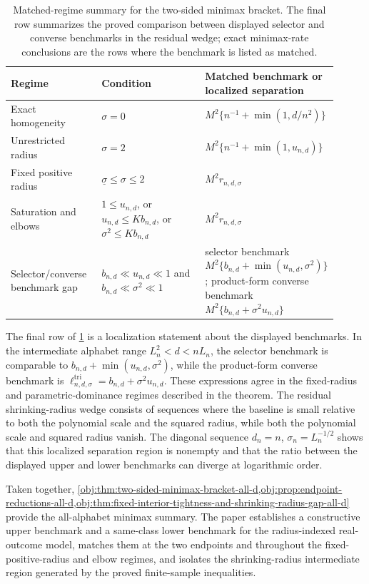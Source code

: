 \begin{table}[t]
\centering
\begin{tabular}{p{0.28\linewidth}p{0.33\linewidth}p{0.30\linewidth}}
\hline
Regime & Condition & Matched benchmark or localized separation \\
\hline
Exact homogeneity & \(\sigma=0\) & \(M^2\{n^{-1}+\min(1,d/n^2)\}\) \\
Unrestricted radius & \(\sigma=2\) & \(M^2\{n^{-1}+\min(1,u_{n,d})\}\) \\
Fixed positive radius & \(\underline\sigma\le\sigma\le2\) & \(M^2r_{n,d,\sigma}\) \\
Saturation and elbows & \(1\le u_{n,d}\), or \(u_{n,d}\le Kb_{n,d}\), or \(\sigma^2\le Kb_{n,d}\) & \(M^2r_{n,d,\sigma}\) \\
Selector/converse benchmark gap & \(b_{n,d}\ll u_{n,d}\ll1\) and \(b_{n,d}\ll\sigma^2\ll1\) & selector benchmark \(M^2\{b_{n,d}+\min(u_{n,d},\sigma^2)\}\); product-form converse benchmark \(M^2\{b_{n,d}+\sigma^2u_{n,d}\}\) \\
\hline
\end{tabular}
\caption{Matched-regime summary for the two-sided minimax bracket. The final row summarizes the proved comparison between displayed selector and converse benchmarks in the residual wedge; exact minimax-rate conclusions are the rows where the benchmark is listed as matched.}
\label{tab:matched-regimes}
\end{table}

The final row of \cref{tab:matched-regimes} is a localization statement about the displayed benchmarks. In the intermediate alphabet range \(L_n^2<d<nL_n\), the selector benchmark is comparable to \(b_{n,d}+\min(u_{n,d},\sigma^2)\), while the product-form converse benchmark is \(\ell^{\mathrm{tri}}_{n,d,\sigma}=b_{n,d}+\sigma^2u_{n,d}\). These expressions agree in the fixed-radius and parametric-dominance regimes described in the theorem. The residual shrinking-radius wedge consists of sequences where the baseline is small relative to both the polynomial scale and the squared radius, while both the polynomial scale and squared radius vanish. The diagonal sequence \(d_n=n\), \(\sigma_n=L_n^{-1/2}\) shows that this localized separation region is nonempty and that the ratio between the displayed upper and lower benchmarks can diverge at logarithmic order.

Taken together, \cref{obj:thm:two-sided-minimax-bracket-all-d,obj:prop:endpoint-reductions-all-d,obj:thm:fixed-interior-tightness-and-shrinking-radius-gap-all-d} provide the all-alphabet minimax summary. The paper establishes a constructive upper benchmark and a same-class lower benchmark for the radius-indexed real-outcome model, matches them at the two endpoints and throughout the fixed-positive-radius and elbow regimes, and isolates the shrinking-radius intermediate region generated by the proved finite-sample inequalities.

